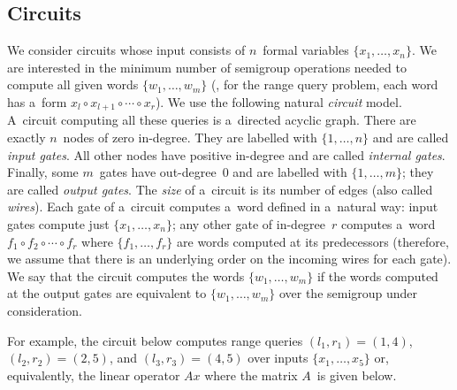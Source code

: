 \documentclass{toc}
\begin{document}
\subsection{Circuits}\label{subsec:circuits}
We consider circuits whose input consists of $n$~formal variables
$\{x_1, \dotsc, x_n\}$. We are interested in the minimum number of semigroup
operations needed to compute all given words $\{w_1, \dotsc, w_m\}$ (\eg, for
the range query problem,
each word has a~form $x_l\circ x_{l+1}\circ \dotsb \circ x_r$).
We use
the following natural \emph{circuit} model. A~circuit computing all these queries
is a~directed acyclic graph. There are exactly $n$~nodes of zero in-degree. They
are labelled with $\{1, \dotsc, n\}$ and are called \emph{input gates}. All
other nodes have positive in-degree and are called
\emph{internal gates}.
Finally, some
$m$~gates have out-degree~0 and are labelled with $\{1, \dotsc, m\}$; they are
called \emph{output gates}.
The
\emph{size} of a~circuit is its number of edges (also called \emph{wires}). Each
gate of a~circuit computes a~word defined in a~natural way: input gates compute
just $\{x_1, \dotsc, x_n\}$; any other gate of in-degree~$r$ computes a~word
$f_1 \circ f_2 \circ \dotsb \circ f_r$ where $\{f_1, \dotsc, f_r\}$ are words
computed at its predecessors (therefore, we assume that there is an underlying
order on the incoming wires for each gate). We say that the circuit computes the
words $\{w_1, \dotsc, w_m\}$ if the words computed at the output gates are
equivalent to $\{w_1, \dotsc, w_m\}$ over the %
semigroup under consideration.  %

For example, the circuit below computes range queries
$(l_1,r_1)=(1,4)$,
$(l_2,r_2)=(2,5)$, and
$(l_3,r_3)=(4,5)$
over inputs $\{x_1, \dotsc, x_5\}$ or, equivalently, the
linear operator $Ax$ where the matrix $A$~is given below.

\vspace{5mm}
\begin{center}
\end{center}
\vspace{5mm}
\end{document}
